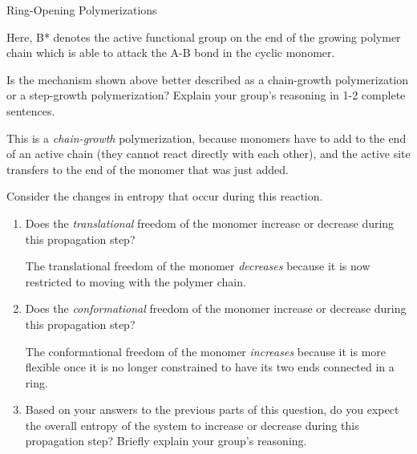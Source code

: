 \begin{activity}{Ring-Opening Polymerizations}
\begin{model}
	Here, B* denotes the active functional group on the end of the growing polymer chain which is able to attack the A-B bond in the cyclic monomer.
	
	
	
\end{model}


\begin{ctqs}

	\question Is the mechanism shown above better described as a chain-growth polymerization or a step-growth polymerization?  Explain your group's reasoning in 1-2 complete sentences.
			
				\begin{solution}[1in]
					This is a \emph{chain-growth} polymerization, because monomers have to add to the end of an active chain (they cannot react directly with each other), and the active site transfers to the end of the monomer that was just added.
				\end{solution}
	
	\question Consider the changes in entropy that occur during this reaction.
	
		\begin{enumerate}
			
			\item Does the \textit{translational} freedom of the monomer increase or decrease during this propagation step?  %
			
				\begin{solution}[0.3in]
					The translational freedom of the monomer \textit{decreases} because it is now restricted to moving with the polymer chain.
				\end{solution}
			
			\item Does the \textit{conformational} freedom of the monomer increase or decrease during this propagation step?  %
			
				\begin{solution}[0.3in]
					The conformational freedom of the monomer \textit{increases} because it is more flexible once it is no longer constrained to have its two ends connected in a ring.
				\end{solution}
			
			\item Based on your answers to the previous parts of this question, do you expect the overall entropy of the system to increase or decrease during this propagation step?  Briefly explain your group's reasoning.
			

\end{enumerate}
\end{ctqs}
\end{activity}
